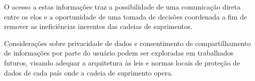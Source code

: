 O acesso a estas informações traz a possibilidade de uma comunicação direta entre os elos e a oportunidade de uma tomada de decisões coordenada a fim de remover as ineficiências inerentes das cadeias de suprimentos.

Considerações sobre privacidade de dados e consentimento de compartilhamento de informações por parte do usuário podem ser exploradas em trabalhados futuros, visando adequar a arquitetura às leis e normas locais de proteção de dados de cada país onde a cadeia de suprimento opera.
